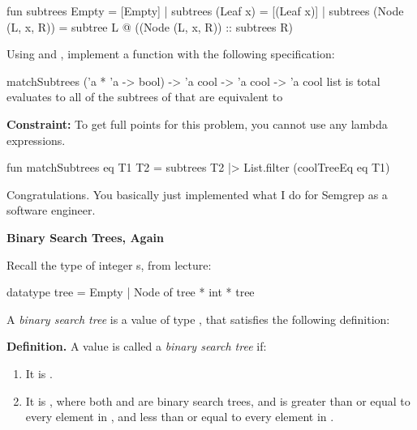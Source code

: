 \documentclass[addpoints,12pt]{exam}
\newenvironment{constraint}{\color{constraint_color}\textbf{Constraint:}}{}
\begin{document}
\begin{questions}
\begin{parts}
    \begin{codeblock}
      fun subtrees Empty = [Empty]
        | subtrees (Leaf x) = [(Leaf x)]
        | subtrees (Node (L, x, R)) =
            subtree L @ ((Node (L, x, R)) :: subtrees R)
    \end{codeblock}

    Using  and
    , implement a function with the following specification:

    \spec
      {matchSubtrees}
      {('a * 'a -> bool) -> 'a cool -> 'a cool -> 'a cool list}
      { is total}
      { evaluates to all of the subtrees
      of  that are equivalent to }

    \begin{constraint}
      To get full points for this problem, you cannot use any lambda expressions.
    \end{constraint}

    \begin{solutionorbox}[25em]
      \begin{codeblock}
        fun matchSubtrees eq T1 T2 =
          subtrees T2
          |> List.filter (coolTreeEq eq T1)
      \end{codeblock}
    \end{solutionorbox}

  Congratulations. You basically just implemented what I do for Semgrep
  as a \\ software engineer.
\end{parts}

\newpage
{}

\textbf{Binary Search Trees, Again}

Recall the type of integer s, from lecture:
\begin{codeblock}
  datatype tree = Empty | Node of tree * int * tree
\end{codeblock}

A \textit{binary search tree} is a value of type , that satisfies the
following definition:

\textbf{Definition.} A value  is called a \textit{binary search tree} if:
\begin{enumerate}
  \item It is .
  \item It is , where both  and  are binary
  search trees, and  is greater than or equal to every
  element in , and less than or equal to every element in .
\end{enumerate}


\end{questions}
\end{document}
